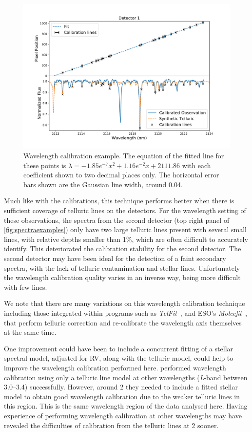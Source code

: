 \begin{figure}
    \centering
    \includegraphics[width=0.8\linewidth]{figures/reduction/calibration.pdf}
    \caption{Wavelength calibration example.
    The equation of the fitted line for these points is $\lambda = -1.85e^{-7} x^2 + 1.16e^{-2} x + 2111.86$ with each coefficient shown to two decimal places only.
The horizontal error bars shown are the Gaussian line width, around 0.04\nm{}.}
    \label{fig:wl_calibration}
\end{figure}

Much like with the \thar{} calibrations, this technique performs better when there is sufficient coverage of telluric lines on the detectors.
For the wavelength setting of these observations, the spectra from the second detector (top right panel of \cref{fig:spectraexamples}) only have two large telluric lines present with several small lines, with relative depths smaller than 1\%, which are often difficult to accurately identify.
This deteriorated the calibration stability for the second detector.
The second detector may have been ideal for the detection of a faint secondary spectra, with the lack of telluric contamination and stellar lines.
Unfortunately the wavelength calibration quality varies in an inverse way, being more difficult with few lines.

We note that there are many variations on this wavelength calibration technique including those integrated within programs such as \emph{TelFit}~\citet{gullikson_correcting_2014}, and {ESO}'s \emph{Molecfit}~\citet{smette_molecfit_2015}, that perform telluric correction and re-calibrate the wavelength axis themselves at the same time.

One improvement could have been to include a concurrent fitting of a stellar spectral model, adjusted for {RV}, along with the telluric model, could help to improve the wavelength calibration performed here. \citet{piskorz_evidence_2016} performed wavelength calibration using only a telluric line model at other \nir{} wavelengths (\emph{L}-band between 3.0--3.4\um{}) successfully.
However, around 2\um{} they needed to include a fitted stellar model to obtain good wavelength calibration due to the weaker telluric lines in this region.
This is the same wavelength region of the data analysed here.
Having experience of performing wavelength calibration at other wavelengths may have revealed the difficulties of calibration from the telluric lines at 2\um{} sooner.

